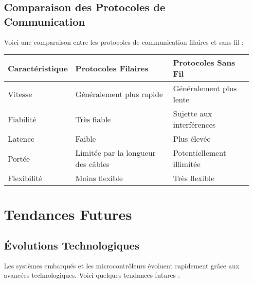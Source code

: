 \documentclass[10pt,a4paper]{article}
\begin{document}

\subsection*{Comparaison des Protocoles de Communication}

Voici une comparaison entre les protocoles de communication filaires et sans fil :

\begin{center}
    \begin{tabular}{|l|l|l|}
    \hline
    \textbf{Caractéristique} & \textbf{Protocoles Filaires} & \textbf{Protocoles Sans Fil} \\
    \hline
    Vitesse & Généralement plus rapide & Généralement plus lente \\
    Fiabilité & Très fiable & Sujette aux interférences \\
    Latence & Faible & Plus élevée \\
    Portée & Limitée par la longueur des câbles & Potentiellement illimitée \\
    Flexibilité & Moins flexible & Très flexible \\
    \hline
    \end{tabular}
\end{center}


\section*{Tendances Futures}

\subsection*{Évolutions Technologiques}

Les systèmes embarqués et les microcontrôleurs évoluent rapidement grâce aux avancées technologiques. Voici quelques tendances futures :
\end{document}
